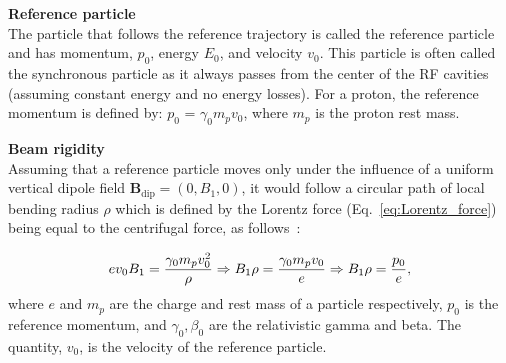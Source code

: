 




\textbf{Reference particle}\\
The particle that follows the reference trajectory is called the reference particle and has momentum, $p_0$, energy $E_0$, and velocity $v_0$.  This particle is often called the synchronous particle as it always passes from the center of the RF cavities (assuming constant energy and no energy losses). For a proton, the reference momentum is defined by: $p_0$ = $\gamma_0 m_p v_0$, where $m_p$ is the proton rest mass.


\textbf{Beam rigidity}\\
Assuming that a reference particle moves only under the influence of a uniform vertical dipole field $\mathbf{B_\mathrm{dip}}=(0, B_1, 0)$, it would follow a circular path of local bending radius $\rho$ which is defined by the Lorentz force (Eq.~\eqref{eq:Lorentz_force}) being equal to the centrifugal force, as follows~\cite{wolski2014}: %

\begin{equation}\label{eq:Brho}
    e v_0 B_1 = \frac{{\gamma_0} m_p v_0^2}{\rho} \Rightarrow B_1 \rho = \frac{\gamma_0 m_p v_0}{e} \Rightarrow B_1 \rho = \frac{p_0}{e},
\end{equation}
where $e$ and $m_p$ are the charge and rest mass of a particle respectively, $p_0$ is the reference momentum, and $\gamma_0, \beta_0$ are the relativistic gamma and beta. The quantity, $v_0$, is the velocity of the reference particle.


